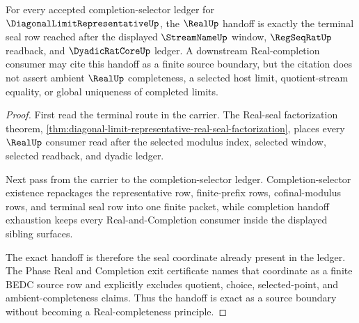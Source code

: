 \begin{theorem}
\label{thm:diagonal-limit-representative-real-handoff-exactness}
For every accepted completion-selector ledger for $\DiagonalLimitRepresentativeUp$, the $\RealUp$ handoff is exactly the terminal seal row reached after the displayed $\StreamNameUp$ window, $\RegSeqRatUp$ readback, and $\DyadicRatCoreUp$ ledger. A downstream Real-completion consumer may cite this handoff as a finite source boundary, but the citation does not assert ambient $\RealUp$ completeness, a selected host limit, quotient-stream equality, or global uniqueness of completed limits.
\end{theorem}
\begin{proof}
First read the terminal route in the carrier. The Real-seal factorization theorem, \autoref{thm:diagonal-limit-representative-real-seal-factorization}, places every $\RealUp$ consumer read after the selected modulus index, selected window, selected readback, and dyadic ledger.

Next pass from the carrier to the completion-selector ledger. Completion-selector existence repackages the representative row, finite-prefix rows, cofinal-modulus rows, and terminal seal row into one finite packet, while completion handoff exhaustion keeps every Real-and-Completion consumer inside the displayed sibling surfaces.

The exact handoff is therefore the seal coordinate already present in the ledger. The Phase Real and Completion exit certificate names that coordinate as a finite BEDC source row and explicitly excludes quotient, choice, selected-point, and ambient-completeness claims. Thus the handoff is exact as a source boundary without becoming a Real-completeness principle.
\end{proof}

